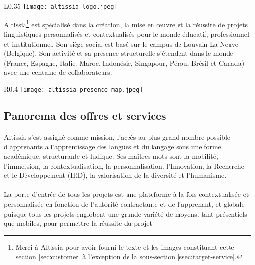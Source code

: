 \begin{wrapfigure}{L}{0.35\textwidth}
    \centering
    \texttt{[image: altissia-logo.jpeg]}
\end{wrapfigure}

Altissia\footnote{Merci à Altissia pour avoir fourni le texte et les images constituant cette section \ref{sec:customer} à l'exception de la sous-section \ref{ssec:target-service}.} est spécialisé dans la création, la mise en œuvre et la réussite de projets linguistiques personnalisés et contextualisés pour le monde éducatif, professionnel et institutionnel.  
Son siège social est basé sur le campus de Louvain-La-Neuve (Belgique).
Son activité et sa présence structurelle s’étendent dans le monde (France, Espagne, Italie, Maroc, Indonésie, Singapour, Pérou, Brésil et Canada) avec une centaine de collaborateurs.
\begin{wrapfigure}{R}{0.4\textwidth}
    \centering
    \texttt{[image: altissia-presence-map.jpeg]}
\end{wrapfigure}

\subsection{Panorema des offres et services}
\paragraph{}
Altissia s’est assigné comme mission, l’accès au plus grand nombre possible d’apprenants à l’apprentissage des langues et du langage sous une forme académique, structurante et ludique. Ses maîtres-mots sont la mobilité, l’immersion, la contextualisation, la personnalisation, l’Innovation, la Recherche et le Développement (IRD), la valorisation de la diversité et l’humanisme.

\paragraph{}
La porte d’entrée de tous les projets est une plateforme à la fois contextualisée et personnalisée en fonction de l’autorité contractante et de l’apprenant,
et globale puisque tous les projets englobent une grande variété de moyens,
tant présentiels que mobiles, pour permettre la réussite du projet.

